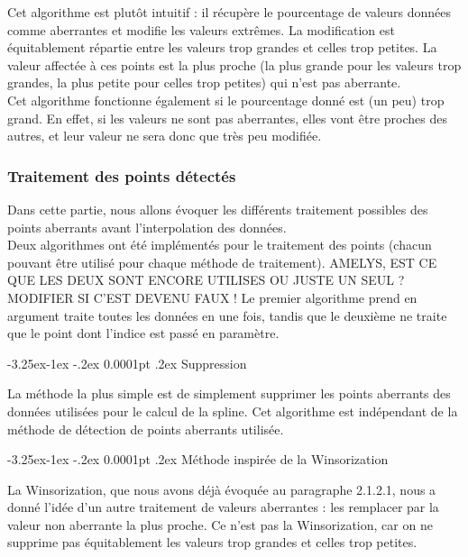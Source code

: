 \documentclass[a4paper,12pt]{article} %
\makeatletter
\renewcommand\paragraph{\@startsection{paragraph}{4}{\z@}%
                                      {-3.25ex\@plus -1ex \@minus -.2ex}%
                                      {0.0001pt \@plus .2ex}%
                                      {\normalfont\normalsize\bfseries}}
\makeatother
\begin{document}
				    Cet algorithme est plutôt intuitif : il récupère le pourcentage de valeurs données comme aberrantes et modifie les valeurs extrêmes. La modification est équitablement répartie entre les valeurs trop grandes et celles trop petites. La valeur affectée à ces points est la plus proche (la plus grande pour les valeurs trop grandes, la plus petite pour celles trop petites) qui n'est pas aberrante.\\
				    
                    Cet algorithme fonctionne également si le pourcentage donné est (un peu) trop grand. En effet, si les valeurs ne sont pas aberrantes, elles vont être proches des autres, et leur valeur ne sera donc que très peu modifiée.
			
			\subsubsection{Traitement des points détectés}
				
    				Dans cette partie, nous allons évoquer les différents traitement possibles des points aberrants avant l'interpolation des données.\\
                        
                    Deux algorithmes ont été implémentés pour le traitement des points (chacun pouvant être utilisé pour chaque méthode de traitement). AMELYS, EST CE QUE LES DEUX SONT ENCORE UTILISES OU JUSTE UN SEUL ? MODIFIER SI C'EST DEVENU FAUX !
                    Le premier algorithme prend en argument traite toutes les données en une fois, tandis que le deuxième ne traite que le point dont l'indice est passé en paramètre. 
                    
					\paragraph{Suppression}
                    					
                        La méthode la plus simple est de simplement supprimer les points aberrants des données utilisées pour le calcul de la spline. Cet algorithme est indépendant de la méthode de détection de points aberrants utilisée.
                        
					\paragraph{Méthode inspirée de la Winsorization}
					
    					La Winsorization, que nous avons déjà évoquée au paragraphe 2.1.2.1, nous a donné l'idée d'un autre traitement de valeurs aberrantes : les remplacer par la valeur non aberrante la plus proche. Ce n'est pas la Winsorization, car on ne supprime pas équitablement les valeurs trop grandes et celles trop petites.
    					
\end{document}
